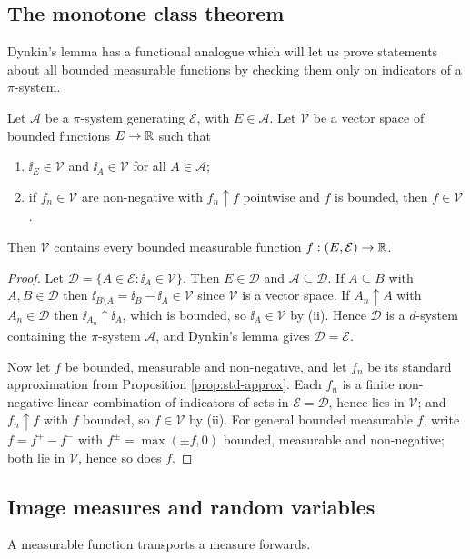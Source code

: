 \documentclass[a4paper]{scrartcl}
\newcommand{\cA}{\mathcal{A}}
\newcommand{\cD}{\mathcal{D}}
\newcommand{\cE}{\mathcal{E}}
\newcommand{\cV}{\mathcal{V}}
\newcommand{\ind}{\ii}
\begin{document}
\subsection{The monotone class theorem}

Dynkin's lemma has a functional analogue which will let us prove statements about all bounded measurable functions by checking them only on indicators of a $\pi$-system.

\begin{theorem}\label{thm:mct-class}
	Let $\cA$ be a $\pi$-system generating $\cE$, with $E \in \cA$. Let $\cV$ be a vector space of bounded functions $E \to \mathbb{R}$ such that
	\begin{enumerate}[label=(\roman*)]
		\item $\ind_E \in \cV$ and $\ind_A \in \cV$ for all $A \in \cA$;
		\item if $f_n \in \cV$ are non-negative with $f_n \uparrow f$ pointwise and $f$ is bounded, then $f \in \cV$.
	\end{enumerate}
	Then $\cV$ contains every bounded measurable function $f: (E,\cE) \to \R$.
\end{theorem}
\begin{proof}
	Let $\cD = \{A \in \cE : \ind_A \in \cV\}$. Then $E \in \cD$ and $\cA \subseteq \cD$. If $A \subseteq B$ with $A,B \in \cD$ then $\ind_{B\setminus A} = \ind_B - \ind_A \in \cV$ since $\cV$ is a vector space. If $A_n \uparrow A$ with $A_n \in \cD$ then $\ind_{A_n} \uparrow \ind_A$, which is bounded, so $\ind_A \in \cV$ by (ii). Hence $\cD$ is a $d$-system containing the $\pi$-system $\cA$, and Dynkin's lemma gives $\cD = \cE$.

	Now let $f$ be bounded, measurable and non-negative, and let $f_n$ be its standard approximation from Proposition \ref{prop:std-approx}. Each $f_n$ is a finite non-negative linear combination of indicators of sets in $\cE = \cD$, hence lies in $\cV$; and $f_n \uparrow f$ with $f$ bounded, so $f \in \cV$ by (ii). For general bounded measurable $f$, write $f = f^+ - f^-$ with $f^\pm = \max(\pm f, 0)$ bounded, measurable and non-negative; both lie in $\cV$, hence so does $f$.
\end{proof}

\subsection{Image measures and random variables}

A measurable function transports a measure forwards.
\end{document}
